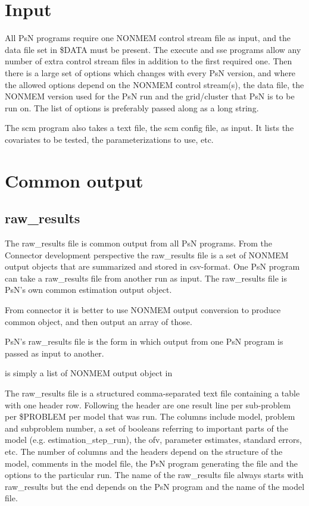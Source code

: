 



\maketitle
\section{Input}
All PsN programs require one NONMEM control stream file as input, 
and the data file set in \$DATA must be present. 
The execute and sse programs allow any number of extra control stream files in addition to the first required one.
Then there is a large set of options which changes with every PsN version, and where the allowed options 
depend on the NONMEM control stream(s), the data file, the NONMEM version used for the PsN run and 
the grid/cluster that PsN is to be run on. The list of options is preferably passed along as a long string.

The scm program also takes a text file, the scm config file, as input. It lists the covariates to be tested, the parameterizations
to use, etc.
\section{Common output}
\subsection{raw\_results}
The raw\_results file is common output from all PsN programs. 
From the Connector development perspective the 
raw\_results file is a set of NONMEM output objects that are summarized and stored in csv-format.
One PsN program can take a raw\_results file from another run as input.
The raw\_results file is PsN's own common estimation output object.

From connector it is better to use NONMEM output conversion to produce common object, and then output an array of those.

PsN's raw\_results file is  the form in which output from one PsN program is passed as input to another.

is simply a list of NONMEM output object in 


The raw\_results file is a structured
comma-separated text file containing a table with one header row. Following the header are one result
line per sub-problem per \$PROBLEM per model that was run.
The columns include model, problem and subproblem number, a 
set of booleans referring to important parts of the model
(e.g. estimation\_step\_run), the ofv, parameter estimates, standard errors,
etc. The number of columns and the headers depend on the structure of the model,
comments in the model file, the PsN program generating the file and the options
to the particular run.
The name of the raw\_results file always starts with raw\_results but the end depends on the 
PsN program and the name of the model file.
